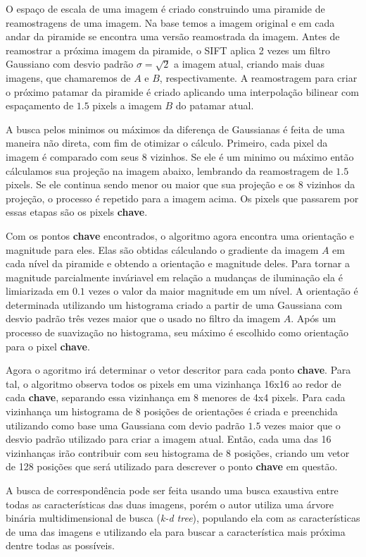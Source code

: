   O espaço de escala de uma imagem é criado construindo uma piramide de reamostragens de uma imagem. Na base temos a 
imagem original e em cada andar da piramide se encontra uma versão reamostrada da imagem. Antes de reamostrar a próxima 
imagem da piramide, o SIFT aplica 2 vezes um filtro Gaussiano com desvio padrão $\sigma = \sqrt{2}$ a imagem atual, 
criando mais duas imagens, que chamaremos de $A$ e $B$, respectivamente. A reamostragem para criar o próximo patamar da 
piramide é criado aplicando uma interpolação bilinear com espaçamento de $1.5$ pixels a imagem $B$ do patamar atual.
 
  A busca pelos minimos ou máximos da diferença de Gaussianas é feita de uma maneira não direta, com fim de otimizar
o cálculo. Primeiro, cada pixel da imagem é comparado com seus 8 vizinhos. Se ele é um minimo ou máximo então cálculamos
sua projeção na imagem abaixo, lembrando da reamostragem de $1.5$ pixels. Se ele continua sendo menor ou maior que sua 
projeção e os 8 vizinhos da projeção, o processo é repetido para a imagem acima. Os pixels que passarem por essas 
etapas são os pixels \textbf{chave}.

  Com os pontos \textbf{chave} encontrados, o algoritmo agora encontra uma orientação e magnitude para eles. Elas são
obtidas cálculando o gradiente da imagem $A$ em cada nível da piramide e obtendo a orientação e magnitude deles. Para
tornar a magnitude parcialmente inváriavel em relação a mudanças de iluminação ela é limiarizada em $0.1$ vezes o valor
da maior magnitude em um nível. A orientação é determinada utilizando um histograma criado a partir de uma Gaussiana
com desvio padrão três vezes maior que o usado no filtro da imagem $A$. Após um processo de suavização no histograma,
seu máximo é escolhido como orientação para o pixel \textbf{chave}. 

  Agora o agoritmo irá determinar o vetor descritor para cada ponto \textbf{chave}. Para tal, o algoritmo observa todos
os pixels em uma vizinhança 16x16 ao redor de cada \textbf{chave}, separando essa vizinhança em 8 menores de 4x4 pixels.
Para cada vizinhança um histograma de 8 posições de orientações é criada e preenchida utilizando como base uma Gaussiana
com devio padrão $1.5$ vezes maior que o desvio padrão utilizado para criar a imagem atual. Então, cada uma das 16
vizinhanças irão contribuir com seu histograma de 8 posições, criando um vetor de 128 posições que será utilizado
para descrever o ponto \textbf{chave} em questão. 

  A busca de correspondência pode ser feita usando uma busca exaustiva entre todas as características das duas imagens,
porém o autor utiliza uma árvore binária multidimensional de busca (\textit{k-d tree}), populando ela com as 
características de uma das imagens e utilizando ela para buscar a característica mais próxima dentre todas as possíveis.

